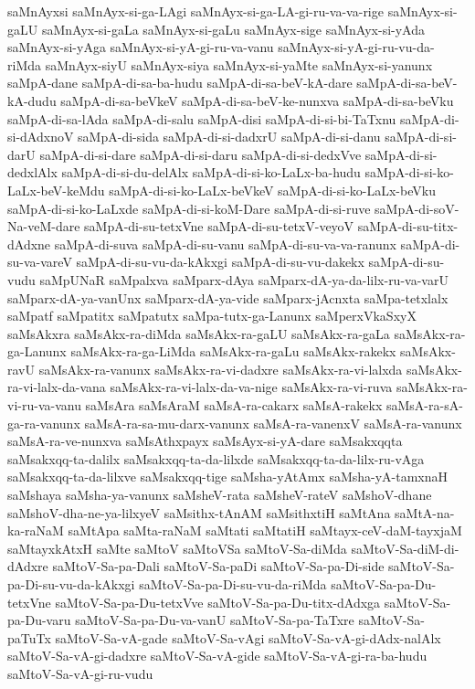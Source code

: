 {saMnAyxsi
saMnAyx-si-ga-LAgi
saMnAyx-si-ga-LA-gi-ru-va-va-rige
saMnAyx-si-gaLU
saMnAyx-si-gaLa
saMnAyx-si-gaLu
saMnAyx-sige
saMnAyx-si-yAda
saMnAyx-si-yAga
saMnAyx-si-yA-gi-ru-va-vanu
saMnAyx-si-yA-gi-ru-vu-da-riMda
saMnAyx-siyU
saMnAyx-siya
saMnAyx-si-yaMte
saMnAyx-si-yanunx
saMpA-dane
saMpA-di-sa-ba-hudu
saMpA-di-sa-beV-kA-dare
saMpA-di-sa-beV-kA-dudu
saMpA-di-sa-beVkeV
saMpA-di-sa-beV-ke-nunxva
saMpA-di-sa-beVku
saMpA-di-sa-lAda
saMpA-di-salu
saMpA-disi
saMpA-di-si-bi-TaTxnu
saMpA-di-si-dAdxnoV
saMpA-di-sida
saMpA-di-si-dadxrU
saMpA-di-si-danu
saMpA-di-si-darU
saMpA-di-si-dare
saMpA-di-si-daru
saMpA-di-si-dedxVve
saMpA-di-si-dedxlAlx
saMpA-di-si-du-delAlx
saMpA-di-si-ko-LaLx-ba-hudu
saMpA-di-si-ko-LaLx-beV-keMdu
saMpA-di-si-ko-LaLx-beVkeV
saMpA-di-si-ko-LaLx-beVku
saMpA-di-si-ko-LaLxde
saMpA-di-si-koM-Dare
saMpA-di-si-ruve
saMpA-di-soV-Na-veM-dare
saMpA-di-su-tetxVne
saMpA-di-su-tetxV-veyoV
saMpA-di-su-titx-dAdxne
saMpA-di-suva
saMpA-di-su-vanu
saMpA-di-su-va-va-ranunx
saMpA-di-su-va-vareV
saMpA-di-su-vu-da-kAkxgi
saMpA-di-su-vu-dakekx
saMpA-di-su-vudu
saMpUNaR
saMpalxva
saMparx-dAya
saMparx-dA-ya-da-lilx-ru-va-varU
saMparx-dA-ya-vanUnx
saMparx-dA-ya-vide
saMparx-jAcnxta
saMpa-tetxlalx
saMpatf
saMpatitx
saMpatutx
saMpa-tutx-ga-Lanunx
saMperxVkaSxyX
saMsAkxra
saMsAkx-ra-diMda
saMsAkx-ra-gaLU
saMsAkx-ra-gaLa
saMsAkx-ra-ga-Lanunx
saMsAkx-ra-ga-LiMda
saMsAkx-ra-gaLu
saMsAkx-rakekx
saMsAkx-ravU
saMsAkx-ra-vanunx
saMsAkx-ra-vi-dadxre
saMsAkx-ra-vi-lalxda
saMsAkx-ra-vi-lalx-da-vana
saMsAkx-ra-vi-lalx-da-va-nige
saMsAkx-ra-vi-ruva
saMsAkx-ra-vi-ru-va-vanu
saMsAra
saMsAraM
saMsA-ra-cakarx
saMsA-rakekx
saMsA-ra-sA-ga-ra-vanunx
saMsA-ra-sa-mu-darx-vanunx
saMsA-ra-vanenxV
saMsA-ra-vanunx
saMsA-ra-ve-nunxva
saMsAthxpayx
saMsAyx-si-yA-dare
saMsakxqqta
saMsakxqq-ta-dalilx
saMsakxqq-ta-da-lilxde
saMsakxqq-ta-da-lilx-ru-vAga
saMsakxqq-ta-da-lilxve
saMsakxqq-tige
saMsha-yAtAmx
saMsha-yA-tamxnaH
saMshaya
saMsha-ya-vanunx
saMsheV-rata
saMsheV-rateV
saMshoV-dhane
saMshoV-dha-ne-ya-lilxyeV
saMsithx-tAnAM
saMsithxtiH
saMtAna
saMtA-na-ka-raNaM
saMtApa
saMta-raNaM
saMtati
saMtatiH
saMtayx-ceV-daM-tayxjaM
saMtayxkAtxH
saMte
saMtoV
saMtoVSa
saMtoV-Sa-diMda
saMtoV-Sa-diM-di-dAdxre
saMtoV-Sa-pa-Dali
saMtoV-Sa-paDi
saMtoV-Sa-pa-Di-side
saMtoV-Sa-pa-Di-su-vu-da-kAkxgi
saMtoV-Sa-pa-Di-su-vu-da-riMda
saMtoV-Sa-pa-Du-tetxVne
saMtoV-Sa-pa-Du-tetxVve
saMtoV-Sa-pa-Du-titx-dAdxga
saMtoV-Sa-pa-Du-varu
saMtoV-Sa-pa-Du-va-vanU
saMtoV-Sa-pa-TaTxre
saMtoV-Sa-paTuTx
saMtoV-Sa-vA-gade
saMtoV-Sa-vAgi
saMtoV-Sa-vA-gi-dAdx-nalAlx
saMtoV-Sa-vA-gi-dadxre
saMtoV-Sa-vA-gide
saMtoV-Sa-vA-gi-ra-ba-hudu
saMtoV-Sa-vA-gi-ru-vudu
}
